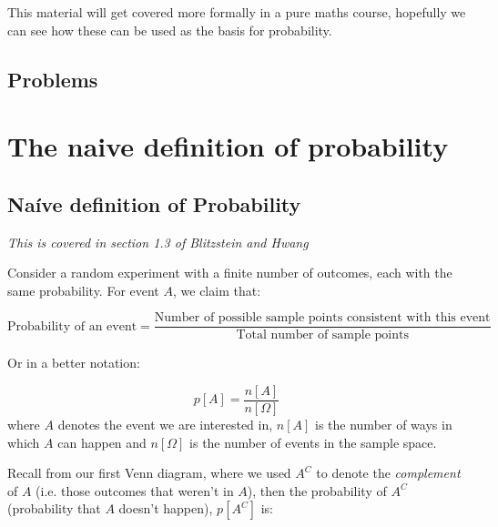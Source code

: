 \documentclass[12pt]{extbook}
\begin{document}
This material will get covered more formally in a pure maths course, hopefully we can see how these can be used as the basis for probability.



\section{Problems}
\begin{enumerate}


%
%

\end{enumerate}



\chapter{The naive definition of probability}

\section{Na\'ive definition of Probability}

\textit{This is covered in section 1.3 of Blitzstein and Hwang}

Consider a random experiment with a finite number of outcomes, each with the same probability.   For event $A$, we claim that:

\begin{displaymath}
\mbox{Probability of an event} = \frac{\mbox{Number of possible sample points consistent with this event}}{\mbox{Total number of sample points}}
\end{displaymath}

Or in a better notation:

\begin{equation}
p[A] = \frac{n[A]}{n[\Omega]}
\end{equation}
where $A$ denotes the event we are interested in, $n[A]$ is the number of ways in which $A$ can happen and $n[\Omega]$ is the number of events in the sample space.  


Recall from our first Venn diagram, where we used $A^C$ to denote the \emph{complement} of $A$ (i.e. those outcomes that weren't in $A$), then the probability of $A^C$ (probability that $A$ doesn't happen), $p[A^C]$ is:
\end{document}
